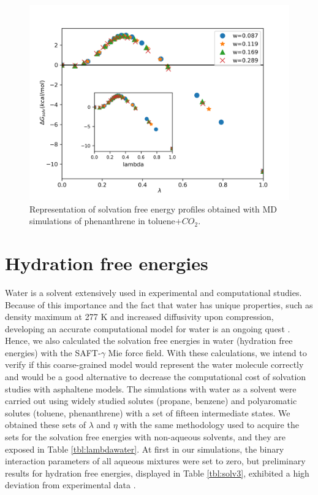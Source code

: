 \begin{figure}[H]
	\centering
	\includegraphics[width=0.8\linewidth]{Figures/tolco2}
	\caption{Representation of solvation free energy profiles obtained with MD simulations of phenanthrene in toluene+$CO_{2}$.}
	\label{fig:Figure_1}
\end{figure}


\section{Hydration free energies}

Water is a solvent extensively used in experimental and computational studies. Because of this importance and the fact that water has unique properties, such as density maximum at 277 K and increased diffusivity upon compression, developing an accurate computational model for water is an ongoing quest \cite{hadley2012}. Hence, we also calculated the solvation free energies in water (hydration free energies) with the SAFT-$\gamma$ Mie force field. With these calculations, we intend to verify if this coarse-grained model would represent the water molecule correctly and would be a good alternative to decrease the computational cost of solvation studies with asphaltene models. The simulations with water as a solvent were carried out using widely studied solutes (propane, benzene) and polyaromatic solutes (toluene, phenanthrene) with a set of fifteen intermediate states.  We obtained these sets of $\lambda$ and $\eta$ with the same methodology used to acquire the sets for the solvation free energies with non-aqueous solvents, and they are exposed in Table \ref{tbl:lambdawater}. At first in our simulations, the binary interaction parameters of all aqueous mixtures were set to zero, but preliminary results for hydration free energies, displayed in Table \ref{tbl:solv3},  exhibited a high deviation from experimental data \cite{P29900000291, doi:10.1021/ct050097l}.

